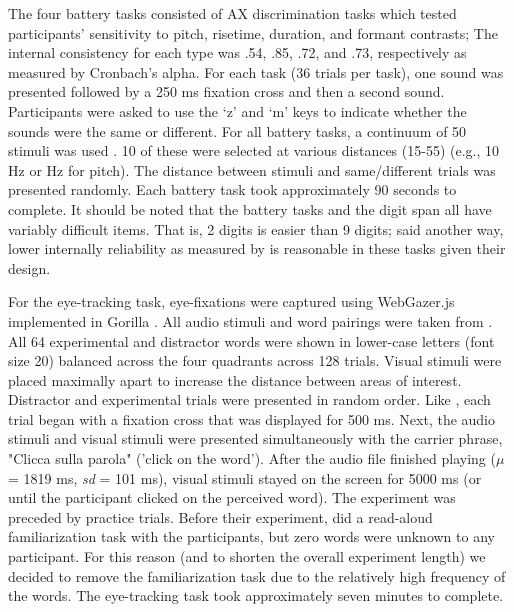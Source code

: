 The four battery tasks consisted of AX discrimination tasks which tested participants' sensitivity to pitch, risetime, duration, and formant contrasts; The internal consistency for each type was .54, .85, .72, and .73, respectively as measured by Cronbach's alpha. For each task (36 trials per task), one sound was presented followed by a 250 ms fixation cross and then a second sound. Participants were asked to use the `z' and `m' keys to indicate whether the sounds were the same or different. For all battery tasks, a continuum of 50 stimuli was used \citep{Kachlicka_Saito_Tierney_2019}. 10 of these were selected at various distances (15-55) (e.g., 10 Hz or Hz for pitch). The distance between stimuli and same/different trials was presented randomly. Each battery task took approximately 90 seconds to complete. It should be noted that the battery tasks and the digit span all have variably difficult items. That is, 2 digits is easier than 9 digits; said another way, lower internally reliability as measured by \citep{Cronbach1951} is reasonable in these tasks given their design. 

For the eye-tracking task, eye-fixations were captured using WebGazer.js \citep{Papoutsaki} implemented in Gorilla \citep{Anwyl-Irvine_2019}. All audio stimuli and word pairings were taken from \cite{Sulpizio_McQueen_2012}. All 64 experimental and distractor words were shown in lower-case letters (font size 20) balanced across the four quadrants across 128 trials. Visual stimuli were placed maximally apart to increase the distance between areas of interest. Distractor and experimental trials were presented in random order. Like \cite{Sulpizio_McQueen_2012}, each trial began with a fixation cross that was displayed for 500 ms. Next, the audio stimuli and visual stimuli were presented simultaneously with the carrier phrase, "Clicca sulla parola" ('click on the word'). After the audio file finished playing ($\mu$ = 1819 ms, \textit{sd} = 101 ms), visual stimuli stayed on the screen for 5000 ms (or until the participant clicked on the perceived word). The experiment was preceded by practice trials. Before their experiment, \cite{Sulpizio_McQueen_2012} did a read-aloud familiarization task with the participants, but zero words were unknown to any participant. For this reason (and to shorten the overall experiment length) we decided to remove the familiarization task due to the relatively high frequency of the words. The eye-tracking task took approximately seven minutes to complete.

